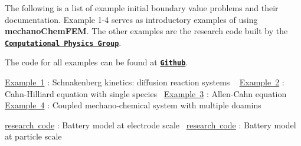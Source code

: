 The following is a list of example initial boundary value problems and their documentation. Example 1-\/4 serves as introductory examples of using {\bfseries{mechano\+Chem\+F\+EM}}. The other examples are the research code built by the \href{http://umich.edu/~compphys/index.html}{\texttt{ {\bfseries{Computational Physics Group}}}}.

The code for all examples can be found at \href{https://github.com/mechanoChem/mechanoChemFEM/tree/example}{\texttt{ {\bfseries{Github}}}}.

\mbox{\hyperlink{diffusion_reaction}{Example 1}} \+: Schnakenberg kinetics\+: diffusion reaction systems ~\newline
 \mbox{\hyperlink{_cahn_hilliard}{Example 2}} \+: Cahn-\/\+Hilliard equation with single species~\newline
 \mbox{\hyperlink{_allen__cahn}{Example 3}} \+: Allen-\/\+Cahn equation ~\newline
 \mbox{\hyperlink{growth}{Example 4}} \+: Coupled mechano-\/chemical system with multiple doamins~\newline
 



\mbox{\hyperlink{battery_electrode_scale}{research code}} \+: Battery model at electrode scale~\newline
 \mbox{\hyperlink{battery_particle}{research code}} \+: Battery model at particle scale~\newline

